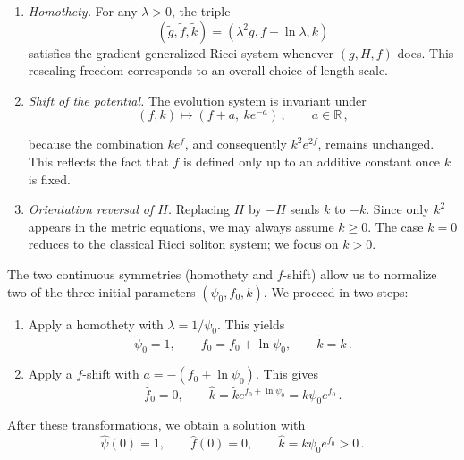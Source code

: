 \documentclass[12pt,a4paper,reqno]{amsart}
\theoremstyle{plain}
\theoremstyle{remark}
\numberwithin{equation}{section}
\newcommand{\R}{\mathbb{R}}
\begin{document}
\begin{enumerate}[label=(\roman*), leftmargin=*, topsep=5pt, itemsep=5pt]
\item \emph{Homothety.} For any $\lambda > 0$, the triple
\begin{equation*}
(\tilde{g}, \tilde{f}, \tilde{k}) = (\lambda^2 g, f - \ln\lambda, k)
\end{equation*}
satisfies the gradient generalized Ricci system whenever $(g,H,f)$ does. This rescaling freedom corresponds to an overall choice of length scale.

\item \emph{Shift of the potential.} The evolution system is invariant under
\begin{equation*}
(f, k) \longmapsto (f + a,\ k e^{-a}) \,, \qquad a \in \R \,,
\end{equation*}

because the combination $k e^{f}$, and consequently $k^2 e^{2f}$, remains unchanged. This reflects the fact that $f$ is defined only up to an additive constant once $k$ is fixed.

\item \emph{Orientation reversal of $H$.} Replacing $H$ by $-H$ sends $k$ to $-k$. Since only $k^2$ appears in the metric equations, we may always assume $k \geq 0$. The case $k=0$ reduces to the classical Ricci soliton system; we focus on $k>0$.
\end{enumerate}

The two continuous symmetries (homothety and $f$-shift) allow us to normalize two of the three initial parameters $(\psi_0, f_0, k)$. We proceed in two steps:

\begin{enumerate}[leftmargin=*, topsep=5pt, itemsep=5pt]
\item Apply a homothety with $\lambda = 1/\psi_0$. This yields
\begin{equation*}
\tilde{\psi}_0 = 1, \qquad \tilde{f}_0 = f_0 + \ln\psi_0, \qquad \tilde{k} = k \,.
\end{equation*}

\item Apply a $f$-shift with $a = - (f_0 + \ln\psi_0)$. This gives
\begin{equation*}
\hat{f}_0 = 0, \qquad \hat{k} = \tilde{k} e^{f_0 + \ln\psi_0} = k \psi_0e^{f_0} \,.
\end{equation*}
\end{enumerate}

After these transformations, we obtain a solution with
\begin{equation}\label{eq:normalizedinitial}
\hat{\psi}(0)=1, \qquad \hat{f}(0)=0, \qquad \hat{k} = k \psi_0e^{f_0} > 0 \,.
\end{equation}
\end{document}
